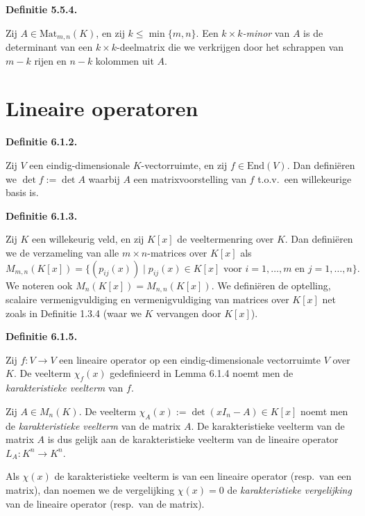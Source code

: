 \documentclass[10pt,a4paper]{article}
\newenvironment{res}[1]{%
  \par\noindent\textbf{Definitie #1.}~\ignorespaces
}{%
  \par\vspace{2pt}\normalfont
}
\begin{document}
\begin{res}{5.5.4}
Zij $A\in \mathrm{Mat}_{m,n}(K)$, en zij $k\le\min\{m,n\}$. Een \textit{$k\times k$-minor} van $A$ is de determinant van een $k\times k$-deelmatrix die we verkrijgen door het schrappen van $m-k$ rijen en $n-k$ kolommen uit $A$.
\end{res}

\section{Lineaire operatoren}

\begin{res}{6.1.2}
Zij $V$ een eindig-dimensionale $K$-vectorruimte, en zij $f\in\mathrm{End}(V)$. Dan defini\"eren we $\det f:=\det A$ waarbij $A$ een matrixvoorstelling van $f$ t.o.v.\ een willekeurige basis is.
\end{res}

\begin{res}{6.1.3}
Zij $K$ een willekeurig veld, en zij $K[x]$ de veeltermenring over $K$. Dan defini\"eren we de verzameling van alle $m\times n$-matrices over $K[x]$ als
\[
M_{m,n}(K[x])=\{(p_{ij}(x)) \mid p_{ij}(x)\in K[x] \text{ voor } i=1,\dots,m \text{ en } j=1,\dots,n\}.
\]
We noteren ook $M_n(K[x])=M_{n,n}(K[x])$. We defini\"eren de optelling, scalaire vermenigvuldiging en vermenigvuldiging van matrices over $K[x]$ net zoals in Definitie 1.3.4 (waar we $K$ vervangen door $K[x]$).
\end{res}

\begin{res}{6.1.5}
\begin{myenum}
\item Zij $f:V\to V$ een lineaire operator op een eindig-dimensionale vectorruimte $V$ over $K$. De veelterm $\chi_f(x)$ gedefinieerd in Lemma 6.1.4 noemt men de \textit{karakteristieke veelterm} van $f$.
\item Zij $A\in M_n(K)$. De veelterm $\chi_A(x):=\det(xI_n-A)\in K[x]$ noemt men de \textit{karakteristieke veelterm} van de matrix $A$. De karakteristieke veelterm van de matrix $A$ is dus gelijk aan de karakteristieke veelterm van de lineaire operator $L_A:K^n\to K^n$.
\item Als $\chi(x)$ de karakteristieke veelterm is van een lineaire operator (resp.\ van een matrix), dan noemen we de vergelijking $\chi(x)=0$ de \textit{karakteristieke vergelijking} van de lineaire operator (resp.\ van de matrix).
\end{myenum}
\end{res}
\end{document}
